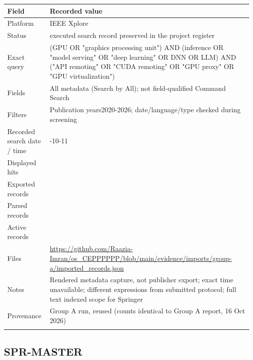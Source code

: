 \begin{longtable}{>{\raggedright\arraybackslash}p{}>{\raggedright\arraybackslash}p{}}
\toprule
\textbf{Field} & \textbf{Recorded value}\\\midrule\endhead
Platform & IEEE Xplore\\\addlinespace
Status & executed search record preserved in the project register\\\addlinespace
Exact query & (GPU OR "graphics processing unit") AND (inference OR "model serving" OR "deep learning" OR DNN OR LLM) AND ("API remoting" OR "CUDA remoting" OR "GPU proxy" OR "GPU virtualization")\\\addlinespace
Fields & All metadata (Search by All); not field-qualified Command Search\\\addlinespace
Filters & Publication years2020-2026; date/language/type checked during screening\\\addlinespace
Recorded search date / time & 2026-10-11\\\addlinespace
Displayed hits & 9\\\addlinespace
Exported records & 9\\\addlinespace
Parsed records & 9\\\addlinespace
Active records & 9\\\addlinespace
Files & \url{https://github.com/Raazia-Imran/os_CEPPPPPP/blob/main/evidence/imports/group-a/imported_records.json}\\\addlinespace
Notes & Rendered metadata capture, not publisher export; exact time unavailable; different expressions from submitted protocol; full text indexed scope for Springer\\\addlinespace
Provenance & Group A run, reused (counts identical to Group A report, 16 Oct 2026)\\\addlinespace
\bottomrule\end{longtable}

\subsection{SPR-MASTER}

